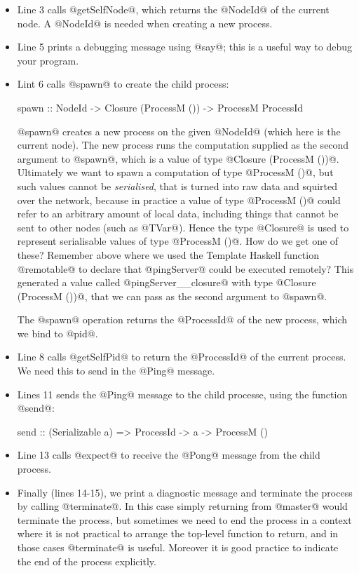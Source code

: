 \begin{itemize}
\item Line 3 calls @getSelfNode@, which returns the @NodeId@ of the
  current node.  A @NodeId@ is needed when creating a new process.

\item Line 5 prints a debugging message using @say@; this is a useful
  way to debug your program.

\item Lint 6 calls @spawn@ to create the child process:

\begin{haskell}
spawn :: NodeId -> Closure (ProcessM ()) -> ProcessM ProcessId
\end{haskell}

  \noindent @spawn@ creates a new process on the given @NodeId@ (which
  here is the current node).  The new process runs the computation
  supplied as the second argument to @spawn@, which is a value of type
  @Closure (ProcessM ())@.  Ultimately we want to spawn a computation
  of type @ProcessM ()@, but such values cannot be \emph{serialised},
  that is turned into raw data and squirted over the network, because
  in practice a value of type @ProcessM ()@ could refer to an
  arbitrary amount of local data, including things that cannot be sent
  to other nodes (such as @TVar@).  Hence the type @Closure@ is used
  to represent serialisable values of type @ProcessM ()@.  How do we
  get one of these?  Remember above where we used the Template Haskell
  function @remotable@ to declare that @pingServer@ could be executed
  remotely?  This generated a value called @pingServer__closure@ with
  type @Closure (ProcessM ())@, that we can pass as the second
  argument to @spawn@.

  The @spawn@ operation returns the @ProcessId@ of the new process,
  which we bind to @pid@.

\item Line 8 calls @getSelfPid@ to return the @ProcessId@ of the
  current process.  We need this to send in the @Ping@ message.

\item Lines 11 sends the @Ping@ message to the child processe, using
  the function @send@:

\begin{haskell}
send :: (Serializable a) => ProcessId -> a -> ProcessM ()
\end{haskell}

\item Line 13 calls @expect@ to receive the @Pong@ message from the
  child process.

\item Finally (lines 14-15), we print a diagnostic message and
  terminate the process by calling @terminate@.  In this case simply
  returning from @master@ would terminate the process, but sometimes
  we need to end the process in a context where it is not practical to
  arrange the top-level function to return, and in those cases
  @terminate@ is useful.  Moreover it is good practice to indicate the
  end of the process explicitly.
\end{itemize}

